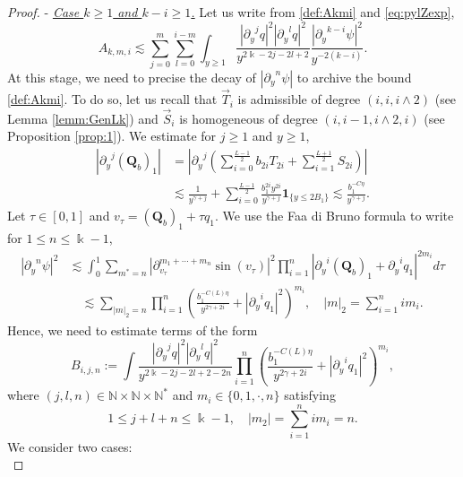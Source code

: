 \documentclass[11pt]{aims}
\theoremstyle{definition}
\numberwithin{equation}{section}
\begin{document}
\begin{proof}
\noindent  - \underline{\textit{Case $k \geq 1$ and $k - i \geq 1$.}} Let us write from \eqref{def:Akmi} and \eqref{eq:pylZexp}, 
\begin{equation}\label{eq:Akmi11}
A_{k,m,i} \lesssim \sum_{j = 0}^{m}\sum_{l = 0}^{i - m} \int_{y \geq 1} \frac{|{\partial_y}^j q|^2 |{\partial_y}^l q|^2}{y^{2\Bbbk - 2j - 2l + 2}} \frac{|{\partial_y}^{k - i} \psi|^2}{y^{-2(k - i)}}.
\end{equation}
At this stage, we need to precise the decay of $|{\partial_y}^n \psi|$ to archive the bound \eqref{def:Akmi}. To do so, let us recall that $\vec T_i$ is admissible of degree $(i,i, i\wedge2)$ (see Lemma \ref{lemm:GenLk}) and $\vec S_i$ is homogeneous of degree $(i,i-1,i \wedge 2, i)$ (see Proposition \ref{prop:1}). We estimate for $j \geq 1$ and $y \geq 1$,
\begin{align*}
|{\partial_y}^j (\mathbf{Q}_b)_1 | &= \left|{\partial_y}^j \left(\sum_{i = 0}^{\frac{L - 1}{2}}b_{2i}T_{2i} + \sum_{i = 1}^{\frac{L + 1}{2}}S_{2i}\right) \right|\\
& \lesssim \frac{1}{y^{\gamma + j}} + \sum_{i = 0}^{\frac{L - 1}{2}}\frac{b_1^{2i} y^{2i}}{y^{\gamma + j}} \mathbf{1}_{\{y \leq 2B_1\}} \lesssim \frac{b_1^{-C\eta}}{y^{\gamma + j}}.
\end{align*}
Let $\tau \in [0,1]$ and $v_\tau = (\mathbf{Q}_b)_1 + \tau q_1$. We use the Faa di Bruno formula to write for $1 \leq n \leq \Bbbk - 1$,
\begin{align}
|{\partial_y}^n \psi|^2 &\lesssim \int_0^1 \sum_{m^* = n} |\partial_{v_\tau}^{m_1 + \cdots+m_n}\sin(v_\tau)|^2  \prod_{i = 1}^n |{\partial_y}^i (\mathbf{Q}_b)_1 + {\partial_y}^iq_1|^{2m_i} d\tau \nonumber\\
&\quad \lesssim \sum_{|m|_2 = n}  \prod_{i = 1}^n \left(\frac{b_1^{-C(L)\eta}}{y^{2\gamma + 2i}} +  |{\partial_y}^iq_1|^2\right)^{m_i}, \quad |m|_2 = \sum_{i = 1}^n im_i. \label{est:psiq1}
\end{align}
Hence, we need to estimate terms of the form 
\begin{equation}
B_{i,j,n}:= \int \frac{|{\partial_y}^j q|^2 |{\partial_y}^l q|^2}{y^{2\Bbbk - 2j - 2l + 2 - 2n}}\prod_{i = 1}^n \left(\frac{b_1^{-C(L)\eta}}{y^{2\gamma + 2i}} +  |{\partial_y}^iq_1|^2\right)^{m_i},
\end{equation}
where $(j,l,n) \in \mathbb{N} \times \mathbb{N} \times \mathbb{N}^*$ and $m_i \in \{0,1, \cdot, n\}$ satisfying  
$$1 \leq j +l +n \leq \Bbbk - 1, \quad |m_2| = \sum_{i = 1}^n im_i = n.$$
We consider two cases:\\

\end{proof}
\end{document}
